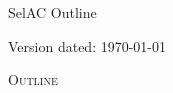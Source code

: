\documentclass[12pt,letterpaper]{article}
\date{Last compiled on \today\xspace at \currenttime.}
\renewcommand{\section}[1]{%
\bigskip
\begin{center}
\begin{Large}
\normalfont\scshape #1
\medskip
\end{Large}
\end{center}}
\newcommand{\selac}{SelAC\xspace}
\begin{document}
\selac Outline

\vfill
\centerline{Version dated: \today}
\vfill



%
%



\section{Outline}
\end{document}

